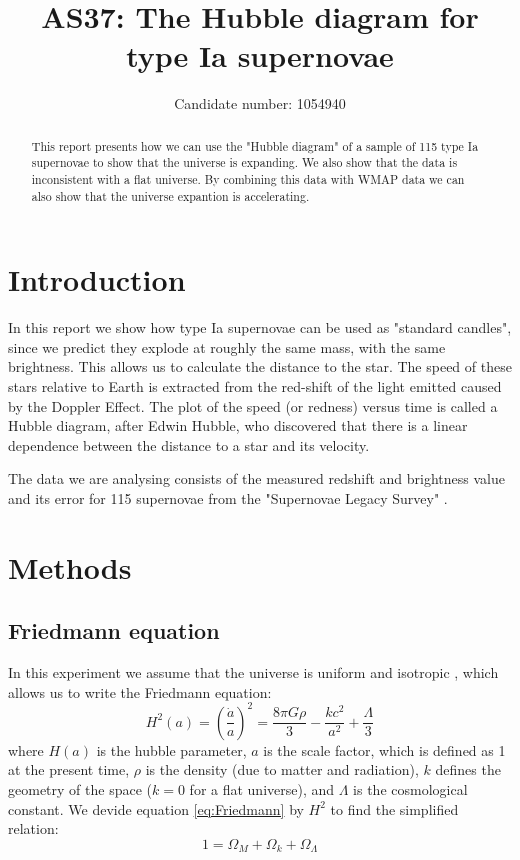 \documentclass[11pt]{article}
\title{AS37: The Hubble diagram for type Ia supernovae}
\author{Candidate number: 1054940}
\begin{document}
\maketitle


\begin{abstract}
This report presents how we can use the "Hubble diagram" of a sample of 115 type Ia supernovae to show that the universe is expanding. We also show that the data is inconsistent with a flat universe. By combining this data with WMAP data we can also show that the universe expantion is accelerating. 
\end{abstract}


\section{Introduction}
In this report we show how type Ia supernovae can be used as "standard candles", since we predict they explode at roughly the same mass, with the same brightness. This allows us to calculate the distance to the star. The speed of these stars relative to Earth is extracted from the red-shift of the light emitted caused by the Doppler Effect. The plot of the speed (or redness) versus time is called a Hubble diagram, after Edwin Hubble, who discovered that there is a linear dependence between the distance to a star and its velocity. 

The data we are analysing consists of the measured redshift and brightness value and its error for 115 supernovae from the "Supernovae Legacy Survey" \cite{SN_legacy_survey}. 


\section{Methods}
\subsection{Friedmann equation}
In this experiment we assume that the universe is uniform and isotropic \cite{AS37_lab_script}, which allows us to write the Friedmann equation: 
\begin{equation}
	H^2(a) = \left( \frac{\dot{a}}{a} \right)^2 = \frac{8 \pi G \rho}{3} - \frac{kc^2}{a^2} + \frac{\Lambda}{3}
	\label{eq:Friedmann}
\end{equation}
where $H(a)$ is the hubble parameter, $a$ is the scale factor, which is defined as 1 at the present time, $\rho$ is the density (due to matter and radiation), $k$ defines the geometry of the space ($k=0$ for a flat universe), and $\Lambda$ is the cosmological constant. We devide equation \eqref{eq:Friedmann} by $H^2$ to find the simplified relation: 
\begin{equation}
	1 = \Omega_M +\Omega_k + \Omega_\Lambda
	\label{eq:main}
\end{equation}
\end{document}
